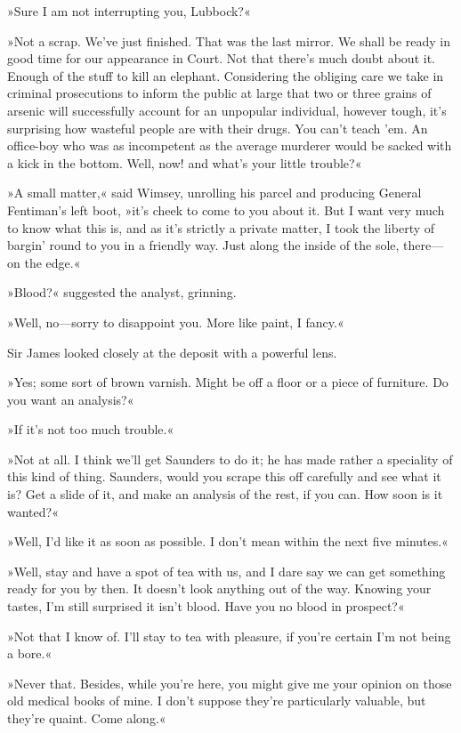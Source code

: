 »Sure I am not interrupting you, Lubbock?«

»Not a scrap. We've just finished. That was the last mirror. We shall be ready in good time for our appearance in Court. Not that there's much doubt about it. Enough of the stuff to kill an elephant. Considering the obliging care we take in criminal prosecutions to inform the public at large that two or three grains of arsenic will successfully account for an unpopular individual, however tough, it's surprising how wasteful people are with their drugs. You can't teach 'em. An office-boy who was as incompetent as the average murderer would be sacked with a kick in the bottom. Well, now! and what's your little trouble?«

»A small matter,« said Wimsey, unrolling his parcel and producing General Fentiman's left boot, »it's cheek to come to you about it. But I want very much to know what this is, and as it's strictly a private matter, I took the liberty of bargin' round to you in a friendly way. Just along the inside of the sole, there\allowbreak---\allowbreak on the edge.«

»Blood?« suggested the analyst, grinning.

»Well, no\allowbreak---\allowbreak sorry to disappoint you. More like paint, I fancy.«

Sir James looked closely at the deposit with a powerful lens.

»Yes; some sort of brown varnish. Might be off a floor or a piece of furniture. Do you want an analysis?«

»If it's not too much trouble.«

»Not at all. I think we'll get Saunders to do it; he has made rather a speciality of this kind of thing. Saunders, would you scrape this off carefully and see what it is? Get a slide of it, and make an analysis of the rest, if you can. How soon is it wanted?«

»Well, I'd like it as soon as possible. I don't mean within the next five minutes.«

»Well, stay and have a spot of tea with us, and I dare say we can get something ready for you by then. It doesn't look anything out of the way. Knowing your tastes, I'm still surprised it isn't blood. Have you no blood in prospect?«

»Not that I know of. I'll stay to tea with pleasure, if you're certain I'm not being a bore.«

»Never that. Besides, while you're here, you might give me your opinion on those old medical books of mine. I don't suppose they're particularly valuable, but they're quaint. Come along.«

